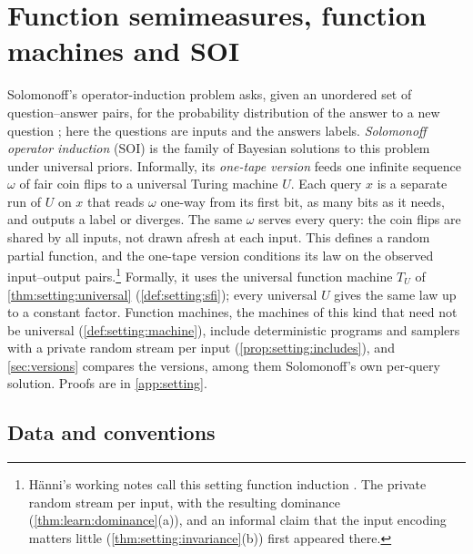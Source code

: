 \section{Function semimeasures, function machines and SOI}\label{sec:setting}

Solomonoff's operator-induction problem asks, given an unordered set of question--answer pairs, for the probability distribution of the answer to a new question \citep{solomonoff2008three}; here the questions are inputs and the answers labels. \emph{Solomonoff operator induction} (SOI) is the family of Bayesian solutions to this problem under universal priors. Informally, its \emph{one-tape version} feeds one infinite sequence $\omega$ of fair coin flips to a universal Turing machine $U$. Each query $x$ is a separate run of $U$ on $x$ that reads $\omega$ one-way from its first bit, as many bits as it needs, and outputs a label or diverges. The same $\omega$ serves every query: the coin flips are shared by all inputs, not drawn afresh at each input. This defines a random partial function, and the one-tape version conditions its law on the observed input--output pairs.\footnote{H\"anni's working notes call this setting function induction \citep{hanni2026notes}. The private random stream per input, with the resulting dominance (\cref{thm:learn:dominance}(a)), and an informal claim that the input encoding matters little (\cref{thm:setting:invariance}(b)) first appeared there.} Formally, it uses the universal function machine $T_U$ of \cref{thm:setting:universal} (\cref{def:setting:sfi}); every universal $U$ gives the same law up to a constant factor. Function machines, the machines of this kind that need not be universal (\cref{def:setting:machine}), include deterministic programs and samplers with a private random stream per input (\cref{prop:setting:includes}), and \cref{sec:versions} compares the versions, among them Solomonoff's own per-query solution. Proofs are in \cref{app:setting}.

\subsection{Data and conventions}\label{sec:setting:data}

